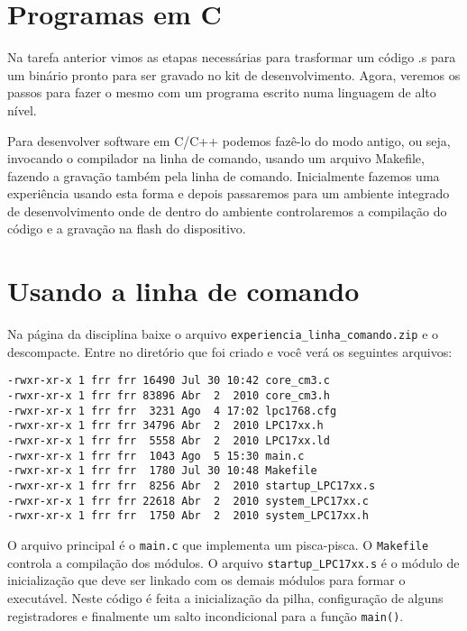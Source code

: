 \documentclass[a4paper,10pt]{article}
\begin{document}
\section{Programas em C}

Na tarefa anterior vimos as etapas necessárias para trasformar um código .s para um binário pronto para ser gravado no kit de desenvolvimento. Agora, veremos os passos para fazer o mesmo com um programa escrito numa linguagem de alto nível.


Para desenvolver software em C/C++ podemos fazê-lo do modo antigo, ou seja, invocando o compilador na linha de comando, usando um arquivo Makefile, fazendo a gravação também pela linha de comando. Inicialmente fazemos uma experiência usando esta forma e depois passaremos para um ambiente integrado de desenvolvimento onde de dentro do ambiente controlaremos a compilação do código e a gravação na flash do dispositivo.


\section{Usando a linha de comando}

Na página da disciplina baixe o arquivo \texttt{experiencia\_linha\_comando.zip}  e o descompacte. Entre no diretório que foi criado e você verá os seguintes arquivos:

\begin{lstlisting}
-rwxr-xr-x 1 frr frr 16490 Jul 30 10:42 core_cm3.c
-rwxr-xr-x 1 frr frr 83896 Abr  2  2010 core_cm3.h
-rwxr-xr-x 1 frr frr  3231 Ago  4 17:02 lpc1768.cfg
-rwxr-xr-x 1 frr frr 34796 Abr  2  2010 LPC17xx.h
-rwxr-xr-x 1 frr frr  5558 Abr  2  2010 LPC17xx.ld
-rwxr-xr-x 1 frr frr  1043 Ago  5 15:30 main.c
-rwxr-xr-x 1 frr frr  1780 Jul 30 10:48 Makefile
-rwxr-xr-x 1 frr frr  8256 Abr  2  2010 startup_LPC17xx.s
-rwxr-xr-x 1 frr frr 22618 Abr  2  2010 system_LPC17xx.c
-rwxr-xr-x 1 frr frr  1750 Abr  2  2010 system_LPC17xx.h
\end{lstlisting}

O arquivo principal é o \verb|main.c| que implementa um pisca-pisca. O \verb|Makefile| controla a compilação dos módulos. O arquivo \verb|startup_LPC17xx.s| é o módulo de inicialização que deve ser linkado com os demais módulos para formar o executável. Neste código é feita a inicialização da pilha, configuração de alguns registradores e finalmente um salto incondicional para a função \verb|main()|. 
\end{document}

